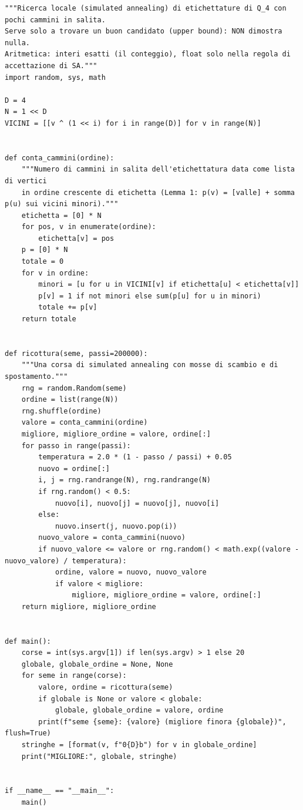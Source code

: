 \documentclass[11pt,a4paper]{article}
\begin{document}
\begin{lstlisting}[caption={certificati/q4\_ricerca\_locale.py}]
"""Ricerca locale (simulated annealing) di etichettature di Q_4 con pochi cammini in salita.
Serve solo a trovare un buon candidato (upper bound): NON dimostra nulla.
Aritmetica: interi esatti (il conteggio), float solo nella regola di accettazione di SA."""
import random, sys, math

D = 4
N = 1 << D
VICINI = [[v ^ (1 << i) for i in range(D)] for v in range(N)]


def conta_cammini(ordine):
    """Numero di cammini in salita dell'etichettatura data come lista di vertici
    in ordine crescente di etichetta (Lemma 1: p(v) = [valle] + somma p(u) sui vicini minori)."""
    etichetta = [0] * N
    for pos, v in enumerate(ordine):
        etichetta[v] = pos
    p = [0] * N
    totale = 0
    for v in ordine:
        minori = [u for u in VICINI[v] if etichetta[u] < etichetta[v]]
        p[v] = 1 if not minori else sum(p[u] for u in minori)
        totale += p[v]
    return totale


def ricottura(seme, passi=200000):
    """Una corsa di simulated annealing con mosse di scambio e di spostamento."""
    rng = random.Random(seme)
    ordine = list(range(N))
    rng.shuffle(ordine)
    valore = conta_cammini(ordine)
    migliore, migliore_ordine = valore, ordine[:]
    for passo in range(passi):
        temperatura = 2.0 * (1 - passo / passi) + 0.05
        nuovo = ordine[:]
        i, j = rng.randrange(N), rng.randrange(N)
        if rng.random() < 0.5:
            nuovo[i], nuovo[j] = nuovo[j], nuovo[i]
        else:
            nuovo.insert(j, nuovo.pop(i))
        nuovo_valore = conta_cammini(nuovo)
        if nuovo_valore <= valore or rng.random() < math.exp((valore - nuovo_valore) / temperatura):
            ordine, valore = nuovo, nuovo_valore
            if valore < migliore:
                migliore, migliore_ordine = valore, ordine[:]
    return migliore, migliore_ordine


def main():
    corse = int(sys.argv[1]) if len(sys.argv) > 1 else 20
    globale, globale_ordine = None, None
    for seme in range(corse):
        valore, ordine = ricottura(seme)
        if globale is None or valore < globale:
            globale, globale_ordine = valore, ordine
        print(f"seme {seme}: {valore} (migliore finora {globale})", flush=True)
    stringhe = [format(v, f"0{D}b") for v in globale_ordine]
    print("MIGLIORE:", globale, stringhe)


if __name__ == "__main__":
    main()

\end{lstlisting}
\end{document}
